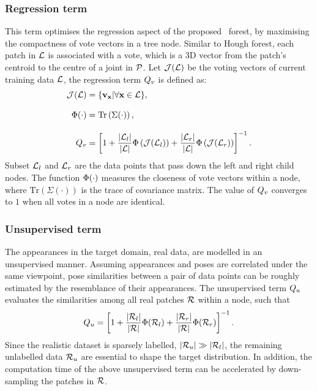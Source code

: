 \subsubsection{Regression term} 
This term optimises the regression aspect of the proposed \STR\ forest, by maximising the compactness of vote vectors in a tree node.  
Similar to Hough forest, each patch in $\mathcal{L}$ is associated with a vote, which is a 3D vector from the patch's centroid to the centre of a joint in $\mathcal{P}$. Let $\mathcal{J}(\mathcal{L})$ be the voting vectors of current training data $\mathcal{L}$, the regression term $Q_{v}$ is defined as: 
\begin{equation}
	\begin{aligned}
		\mathcal{J}(\mathcal{L}) & = \{ \mathbf{v}_{\mathbf{x}}|\forall \mathbf{x} \in \mathcal{L} \},\\[3mm]
		\mathrm{\Phi}(\cdot) & = \mathrm{Tr}\left(\Sigma(\cdot)\right),\\[3mm] 
	Q_{v} & = \left[ 1 + 
		\frac{|\mathcal{L}_{l}|}{|\mathcal{L}|} \mathrm{\Phi}\left(\mathcal{J}(\mathcal{L}_{l})\right) +  
	\frac{|\mathcal{L}_{r}|}{|\mathcal{L}|} \mathrm{\Phi}\left(\mathcal{J}(\mathcal{L}_{r})\right) \right]^{-1}.
	\end{aligned}
	\label{eqn/hand/regterm}
\end{equation}
Subset $\mathcal{L}_{l}$ and $\mathcal{L}_{r}$ are the data points that pass down the left and right child nodes. The function $\mathrm{\Phi}(\cdot)$ measures the closeness of vote vectors within a node, where $\mathrm{Tr}(\Sigma(\cdot))$ is the trace of covariance matrix. The value of $Q_{v}$ converges to $1$ when all votes in a node are identical. 

\subsubsection{Unsupervised term} 
The appearances in the target domain, \ie real data, are modelled in an unsupervised manner.
Assuming appearances and poses are correlated under the same viewpoint, pose similarities between a pair of data points can be roughly estimated by the resemblance of their appearances. The unsupervised term $Q_{u}$ evaluates the similarities among all real patches $\mathcal{R}$ within a node, such that 
\begin{equation}
	Q_{u} = \left[ 1 + 
		\frac{|\mathcal{R}_{l}|}{|\mathcal{R}|} \mathrm{\Phi}(\mathcal{R}_{l}) +  
	\frac{|\mathcal{R}_{r}|}{|\mathcal{R}|} \mathrm{\Phi}(\mathcal{R}_{r}) \right]^{-1}.
	\label{eqn/hand/usterm}
\end{equation}
Since the realistic dataset is sparsely labelled, \ie $|\mathcal{R}_{u}| \gg |\mathcal{R}_{l}|$, the remaining unlabelled data $\mathcal{R}_{u}$ are essential to shape the target distribution. In addition, the computation time of the above unsupervised term can be accelerated by down-sampling the patches in $\mathcal{R}$.  

